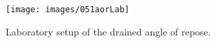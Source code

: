 \begin{figure}[!htb]
\centering
\texttt{[image: images/051aorLab]}
\caption[AoR]{Laboratory setup of the drained angle of repose.}
\label{fig:051aorLab}
\end{figure}